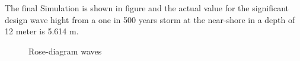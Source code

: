 The final Simulation is shown in figure %
and the actual value for the significant design wave hight from a one in 500 years storm at the near-shore in a depth of 12 meter is 5.614 m.
\begin{figure}[H]
\center
{}
\caption{Rose-diagram waves}
\end{figure}
